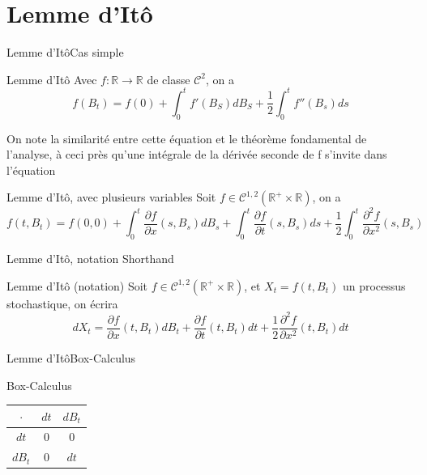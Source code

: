 \documentclass{beamer}
\newcommand{\1}{\mathmybb{1}}
\begin{document}
 \section{Lemme d'Itô}
   \begin{frame}{Lemme d'Itô}{Cas simple}
     \begin{block}{Lemme d'Itô}
       Avec $f: \mathbb{R} \rightarrow \mathbb{R} $ de classe $\mathcal{C}^{2} $, on a
       \begin{equation}
         f(B_{t}) = f(0) + \int_{0}^{t}f'(B_{S})dB_{S} + \frac{1}{2}\int_{0}^{t} f''(B_{s})ds
       \end{equation}
     \end{block}
     \pause
     On note la similarité entre cette équation et le théorème fondamental de l'analyse, à ceci près qu'une intégrale de la dérivée seconde de f s'invite dans l'équation
     \begin{block}{Lemme d'Itô, avec plusieurs variables}
       Soit $f\in \mathcal{C}^{1, 2}(\mathbb{R}^{+} \times \mathbb{R})$, on a
       \begin{equation}
           f(t, B_{t}) = f(0, 0) + \int_{0}^{t}\frac{\partial f}{\partial x}(s, B_{s}) dB_{s} + \int_{0}^{t}\frac{\partial f}{\partial t}(s, B_{s}) ds + \frac{1}{2} \int_{0}^{t}\frac{\partial ^{2} f}{\partial x^{2}}(s, B_{s})
         \end{equation}
         \end{block}
     \end{frame}
     \begin{frame}{Lemme d'Itô, notation Shorthand}
       \begin{block}{Lemme d'Itô (notation)}
         Soit $f\in \mathcal{C}^{1, 2}(\mathbb{R}^{+} \times \mathbb{R})$, et $ X_{t} = f(t, B_{t})$ un processus stochastique, on écrira
         \begin{equation}
           dX_{t} = \frac{\partial f}{\partial x}(t, B_{t}) dB_{t} + \frac{\partial f}{\partial t}(t, B_{t}) dt + \frac{1}{2} \frac{\partial^{2}f}{\partial x^{2}}(t, B_{t}) dt
         \end{equation}
       \end{block}
     \end{frame}
     \begin{frame}{Lemme d'Itô}{Box-Calculus}
       \begin{block}{Box-Calculus}
         \begin{center}
           \begin{tabular}{|c|c|c|}
             \hline
             $\cdot$ & $dt$ & $dB_t$ \\
             \hline
             $dt$ & 0 & 0 \\
             $dB_{t}$ & 0 & $dt$ \\
             \hline
           \end{tabular}
         \end{center}
         \end{block}
       \end{frame}
\end{document}
